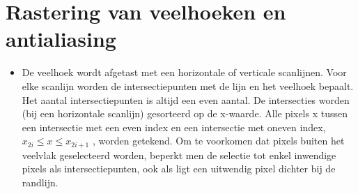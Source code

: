\documentclass{report}
\begin{document}
	\section{Rastering van veelhoeken en antialiasing}
	\begin{enumerate}
		{
			\begin{itemize}
				\item De veelhoek wordt afgetast met een horizontale of verticale scanlijnen. Voor elke scanlijn worden de intersectiepunten met de lijn en het veelhoek bepaalt. Het aantal intersectiepunten is altijd een even aantal. De intersecties worden (bij een horizontale scanlijn) gesorteerd op de x-waarde. Alle pixels x tussen een intersectie met een even index en een intersectie met oneven index, $x_{2i} \leq x \leq x_{2i + 1}$ , worden getekend. Om te voorkomen dat pixels buiten het veelvlak geselecteerd worden, beperkt men de selectie tot enkel inwendige pixels als intersectiepunten, ook als ligt een uitwendig pixel dichter bij de randlijn. 
			\end{itemize}
		}
		

\end{enumerate}
\end{document}
